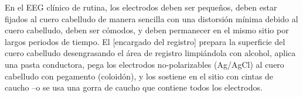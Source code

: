 
En el EEG cl\'inico de rutina, los electrodos 
deben ser peque\~nos, deben estar
fijados al cuero cabelludo de manera sencilla con una distorsi\'on m\'inima debido al cuero cabelludo,
deben ser c\'omodos, y deben permanecer en el mismo sitio por largos periodos de tiempo.
El [encargado del registro] prepara la superficie del cuero cabelludo 
desengrasando el \'area de registro
limpi\'andola con alcohol, aplica una pasta conductora, pega los electrodos no-polarizables (Ag/AgCl)
al cuero cabelludo con pegamento (coloid\'on), y los sostiene en el sitio con cintas de caucho
--o se usa una gorra de caucho que contiene todos los electrodos.


